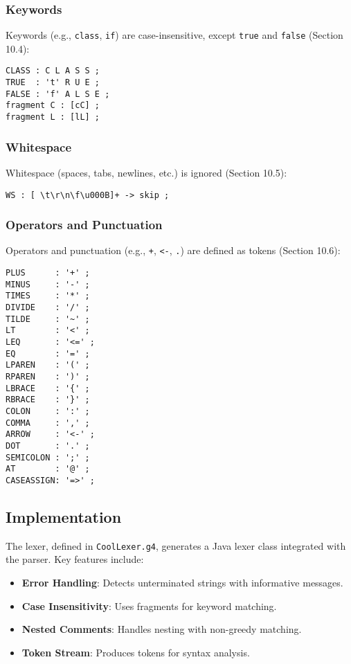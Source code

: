 \documentclass[11pt, titlepage]{article}
\begin{document}
\subsubsection{Keywords}
Keywords (e.g., \texttt{class}, \texttt{if}) are case-insensitive, except \texttt{true} and \texttt{false} (Section 10.4):
\begin{lstlisting}
CLASS : C L A S S ;
TRUE  : 't' R U E ;
FALSE : 'f' A L S E ;
fragment C : [cC] ;
fragment L : [lL] ;
\end{lstlisting}

\subsubsection{Whitespace}
Whitespace (spaces, tabs, newlines, etc.) is ignored (Section 10.5):
\begin{lstlisting}
WS : [ \t\r\n\f\u000B]+ -> skip ;
\end{lstlisting}

\subsubsection{Operators and Punctuation}
Operators and punctuation (e.g., \texttt{+}, \texttt{<-}, \texttt{.}) are defined as tokens (Section 10.6):
\begin{lstlisting}
PLUS      : '+' ;
MINUS     : '-' ;
TIMES     : '*' ;
DIVIDE    : '/' ;
TILDE     : '~' ;
LT        : '<' ;
LEQ       : '<=' ;
EQ        : '=' ;
LPAREN    : '(' ;
RPAREN    : ')' ;
LBRACE    : '{' ;
RBRACE    : '}' ;
COLON     : ':' ;
COMMA     : ',' ;
ARROW     : '<-' ;
DOT       : '.' ;
SEMICOLON : ';' ;
AT        : '@' ;
CASEASSIGN: '=>' ;
\end{lstlisting}

\subsection{Implementation}
The lexer, defined in \texttt{CoolLexer.g4}, generates a Java lexer class integrated with the parser. Key features include:
\begin{itemize}[leftmargin=*]
    \item \textbf{Error Handling}: Detects unterminated strings with informative messages.
    \item \textbf{Case Insensitivity}: Uses fragments for keyword matching.
    \item \textbf{Nested Comments}: Handles nesting with non-greedy matching.
    \item \textbf{Token Stream}: Produces tokens for syntax analysis.
\end{itemize}
\end{document}
